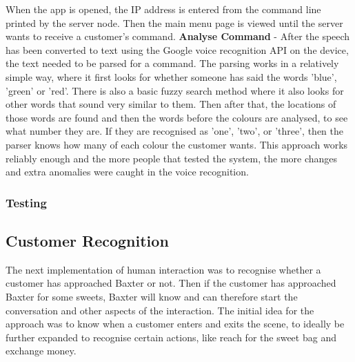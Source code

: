When the app is opened, the IP address is entered from the command line printed by the server node. Then the main menu page is viewed until the server wants to receive a customer's command.
\newline\newline
\textbf{Analyse Command} - After the speech has been converted to text using the Google voice recognition API on the device, the text needed to be parsed for a command. The parsing works in a relatively simple way, where it first looks for whether someone has said the words 'blue', 'green' or 'red'. There is also a basic fuzzy search method where it also looks for other words that sound very similar to them. Then after that, the locations of those words are found and then the words before the colours are analysed, to see what number they are. If they are recognised as 'one', 'two', or 'three', then the parser knows how many of each colour the customer wants. This approach works reliably enough and the more people that tested the system, the more changes and extra anomalies were caught in the voice recognition.
\subsubsection{Testing}
\subsection{Customer Recognition}
The next implementation of human interaction was to recognise whether a customer has approached Baxter or not. Then if the customer has approached Baxter for some sweets, Baxter will know and can therefore start the conversation and other aspects of the interaction. The initial idea for the approach was to know when a customer enters and exits the scene, to ideally be further expanded to recognise certain actions, like reach for the sweet bag and exchange money.
